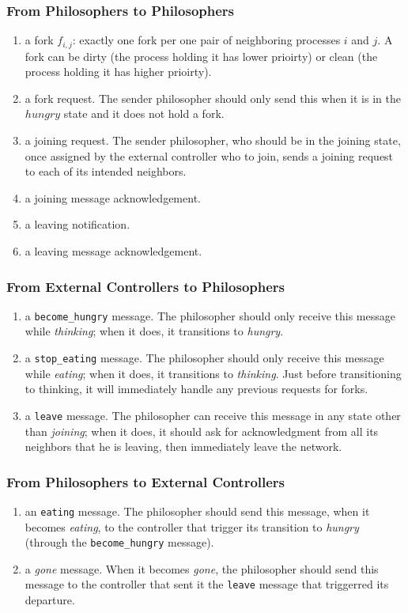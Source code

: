 \documentclass[11pt]{article}
\begin{document}
\subsubsection{From Philosophers to Philosophers}
\begin{enumerate}
\item a fork $f_{i,j}$: exactly one fork per one pair of neighboring processes $i$ and $j$. A fork can be dirty (the process holding it has lower prioirty) or clean (the process holding it has higher prioirty).
\item a fork request. The sender philosopher should only send this when it is in the $hungry$ state and it does not hold a fork.
\item a joining request. The sender philosopher, who should be in the joining state, once assigned by the external controller who to join, sends a joining request to each of its intended neighbors.
\item a joining message acknowledgement.
\item a leaving notification.
\item a leaving message acknowledgement.
\end{enumerate}

\subsubsection{From External Controllers to Philosophers}
\begin{enumerate}
\item a \texttt{become\_hungry} message. The philosopher should only receive this message while \textit{thinking}; when it does, it transitions to \textit{hungry}.
\item a \texttt{stop\_eating} message. The philosopher should only receive this message while \textit{eating}; when it does, it transitions to \textit{thinking}. Just before transitioning to thinking, it will immediately handle any previous requests for forks.
\item a \texttt{leave} message. The philosopher can receive this message in any state other than \textit{joining}; when it does, it should ask for acknowledgment from all its neighbors that he is leaving, then immediately leave the network.
\end{enumerate}

\subsubsection{From Philosophers to External Controllers}
\begin{enumerate}
\item an \texttt{eating} message. The philosopher should send this message, when it becomes \textit{eating}, to the controller that trigger its transition to \textit{hungry} (through the \texttt{become\_hungry} message).
\item a \textit{gone} message. When it becomes \textit{gone}, the philosopher should send this message to the controller that sent it the \texttt{leave} message that triggerred its departure.
\end{enumerate}
\end{document}
